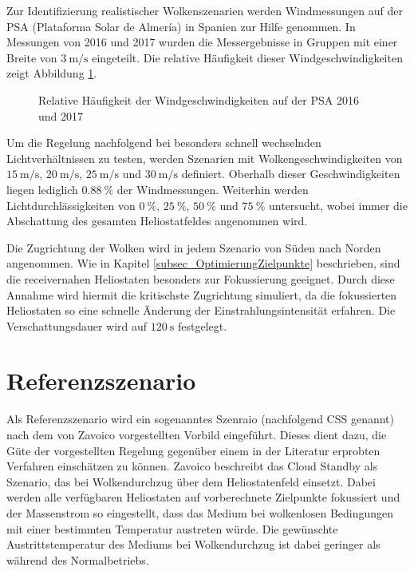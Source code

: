 Zur Identifizierung realistischer Wolkenszenarien werden Windmessungen auf der PSA (Plataforma Solar de Almería) in Spanien zur Hilfe genommen.
In Messungen von 2016 und 2017 wurden die Messergebnisse in Gruppen mit einer Breite von $\SI{3}{\metre\per\second}$ eingeteilt.
Die relative Häufigkeit dieser Windgeschwindigkeiten zeigt Abbildung \ref{fig_Windklassen}.

\begin{figure}[h!]
    \centering
    \setlength{\fboxsep}{1pt}
    \setlength{\fboxrule}{1pt}
    \caption[Relative Häufigkeit der Windgeschwindigkeiten auf der PSA 2016 und 2017]{Relative Häufigkeit der Windgeschwindigkeiten auf der PSA 2016 und 2017}
    \label{fig_Windklassen}
\end{figure}

Um die Regelung nachfolgend bei besonders schnell wechselnden Lichtverhältnissen zu testen, werden Szenarien mit Wolkengeschwindigkeiten von $\SI{15}{\metre\per\second}$, $\SI{20}{\metre\per\second}$, $\SI{25}{\metre\per\second}$ und $\SI{30}{\metre\per\second}$ definiert.
Oberhalb dieser Geschwindigkeiten liegen lediglich $\SI{0.88}{\percent}$ der Windmessungen.
Weiterhin werden Lichtdurchlässigkeiten von $\SI{0}{\percent}$, $\SI{25}{\percent}$, $\SI{50}{\percent}$ und $\SI{75}{\percent}$ untersucht, wobei immer die Abschattung des gesamten Heliostatfeldes angenommen wird.

Die Zugrichtung der Wolken wird in jedem Szenario von Süden nach Norden angenommen.
Wie in Kapitel \ref{subsec_OptimierungZielpunkte} beschrieben, sind die receivernahen Heliostaten besonders zur Fokussierung geeignet.
Durch diese Annahme wird hiermit die kritischste Zugrichtung simuliert, da die fokussierten Heliostaten so eine schnelle Änderung der Einstrahlungsintensität erfahren.
Die Verschattungsdauer wird auf $\SI{120}{\second}$ festgelegt.

\section{Referenzszenario} \label{sec_Referenzszenario}
Als Referenzszenario wird ein sogenanntes  Szenraio (nachfolgend CSS genannt) nach dem von Zavoico \cite[S.25ff]{Zavoico} vorgestellten Vorbild eingeführt.
Dieses dient dazu, die Güte der vorgestellten Regelung gegenüber einem in der Literatur erprobten Verfahren einschätzen zu können.
Zavoico beschreibt das Cloud Standby als Szenario, das bei Wolkendurchzug über dem Heliostatenfeld einsetzt.
Dabei werden alle verfügbaren Heliostaten auf vorberechnete Zielpunkte fokussiert und der Massenstrom so eingestellt, dass das Medium bei wolkenlosen Bedingungen mit einer bestimmten Temperatur austreten würde.
Die gewünschte Austrittstemperatur des Mediums bei Wolkendurchzug ist dabei geringer als während des Normalbetriebs.

